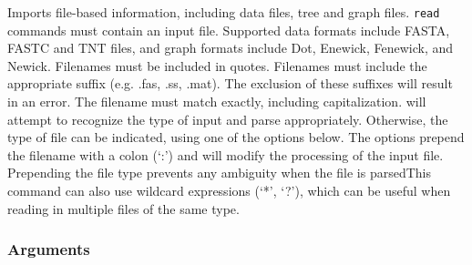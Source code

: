 	\begin{phygdescription}
		{Imports file-based information, including data files, tree and graph files. \texttt{read} 
		commands must contain an input file. Supported data formats include FASTA, FASTC
		and TNT files, and graph formats include Dot, Enewick, Fenewick, and Newick. 
		Filenames must be included in quotes. Filenames must include the appropriate suffix (e.g. .fas, 
		.ss, .mat). The exclusion of these suffixes will result in an error. The filename must
		match exactly, including capitalization. \phyg will attempt to recognize the type of input
		and parse appropriately. Otherwise, the type of file can be indicated, using one of the 
		options below. The options prepend 	the filename with a colon (`:') and will modify the 
		processing of the input file. Prepending the file type prevents any ambiguity when the 
		file is parsedThis command can also use wildcard expressions (`*', `?'), 
		which can be useful when reading in multiple files of the same type.}
	\end{phygdescription}

	\subsubsection{Arguments}
	
